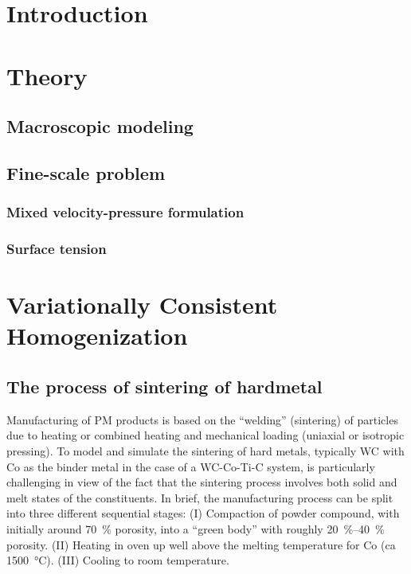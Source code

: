 \documentclass[ExampleMasters.tex]{subfiles}
\begin{document}
\chapter{Introduction}

\chapter{Theory}
\section{Macroscopic modeling}

\section{Fine-scale problem}
\subsection{Mixed velocity-pressure formulation}
\subsection{Surface tension}


\chapter{Variationally Consistent Homogenization}














\section{The process of sintering of hardmetal}

Manufacturing of PM products is based on the ``welding'' (sintering) of particles due to heating or combined heating and mechanical loading (uniaxial or isotropic pressing).
To model and simulate the sintering of hard metals, typically WC with Co as the binder metal in the case of a WC-Co-Ti-C system, is particularly challenging in view of the fact that the sintering process involves both solid and melt states of the constituents.
In brief, the manufacturing process can be split into three different sequential stages:
(I) Compaction of powder compound, with initially around \SI{70}{\percent} porosity, into a ``green body'' with roughly \SIrange{20}{40}{\percent} porosity.
(II) Heating in oven up well above the melting temperature for Co (ca \SI{1500}{\celsius}).
(III) Cooling to room temperature.
\end{document}
